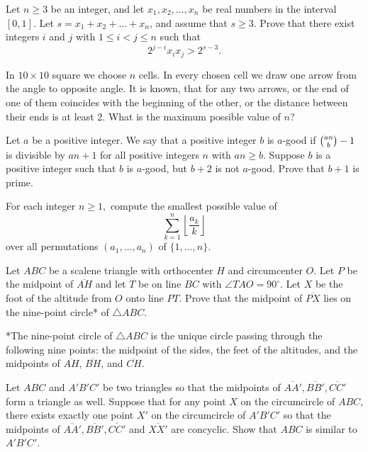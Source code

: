 \documentclass[11pt]{scrartcl}
\begin{document}
\begin{problem}[7550072974614174968]
Let $n \geqslant 3$ be an integer, and let $x_1,x_2,\ldots,x_n$ be real numbers in the interval $[0,1]$. Let $s=x_1+x_2+\ldots+x_n$, and assume that $s \geqslant 3$. Prove that there exist integers $i$ and $j$ with $1 \leqslant i<j \leqslant n$ such that
\[2^{j-i}x_ix_j>2^{s-3}.\]
\end{problem}
\begin{problem}[5949258338135822858]
In $10\times 10$ square we choose $n$ cells. In every chosen cell we draw one arrow from the angle to opposite angle. It is known, that for any two arrows, or the end of one of them coincides with the beginning of the other, or
the distance between their ends is at least 2. What is the maximum possible value of $n$?
\end{problem}
\begin{problem}[1440964279096111130]
	Let $a$ be a positive integer. We say that a positive integer $b$ is $a$-good if $\tbinom{an}{b}-1$ is divisible by $an+1$ for all positive integers $n$ with $an \geq b$. Suppose $b$ is a positive integer such that $b$ is $a$-good, but $b+2$ is not $a$-good. Prove that $b+1$ is prime.
\end{problem}
\begin{problem}[161342796381450]
For each integer $n\ge 1,$ compute the smallest possible value of\[\sum_{k=1}^{n}\left\lfloor\frac{a_k}{k}\right\rfloor\]over all permutations $(a_1,\dots,a_n)$ of $\{1,\dots,n\}.$
\end{problem}
\begin{problem}[528087142744727]
	Let $ABC$ be a scalene triangle with orthocenter $H$ and circumcenter $O$. Let $P$ be the midpoint of $\overline{AH}$ and let $T$ be on line $BC$ with $\angle TAO=90^{\circ}$. Let $X$ be the foot of the altitude from $O$ onto line $PT$. Prove that the midpoint of $\overline{PX}$ lies on the nine-point circle* of $\triangle ABC$.

*The nine-point circle of $\triangle ABC$ is the unique circle passing through the following nine points: the midpoint of the sides, the feet of the altitudes, and the midpoints of $\overline{AH}$, $\overline{BH}$, and $\overline{CH}$.
\end{problem}
\begin{problem}[915997916422887]
	Let $ABC$ and $A'B'C'$ be two triangles so that the midpoints of $\overline{AA'}, \overline{BB'}, \overline{CC'}$ form a triangle as well. Suppose that for any point $X$ on the circumcircle of $ABC$, there exists exactly one point $X'$ on the circumcircle of $A'B'C'$ so that the midpoints of $\overline{AA'}, \overline{BB'}, \overline{CC'}$ and $\overline{XX'}$ are concyclic. Show that $ABC$ is similar to $A'B'C'$.
\end{problem}
\end{document}
